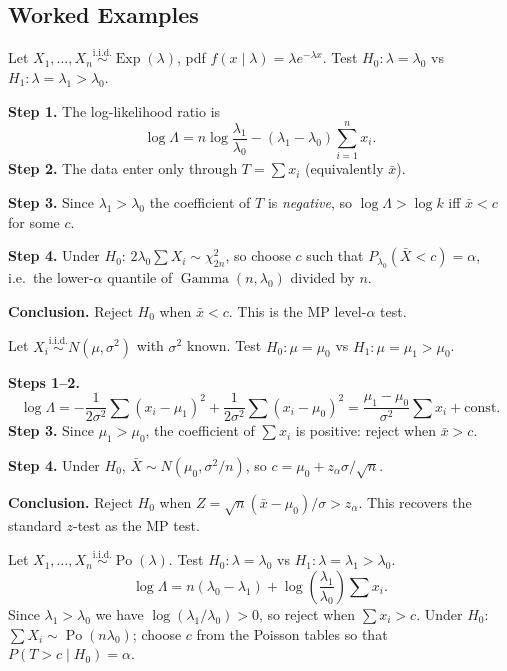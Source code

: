\documentclass[11pt, a4paper]{article}
\newcommand{\iid}{\overset{\text{i.i.d.}}{\sim}}
\begin{document}
\subsection*{Worked Examples}

\begin{exbox}
Let $X_1,\ldots,X_n \iid \operatorname{Exp}(\lambda)$, pdf $f(x \mid \lambda) = \lambda e^{-\lambda x}$. Test $H_0\colon \lambda = \lambda_0$ vs $H_1\colon \lambda = \lambda_1 > \lambda_0$.

\textbf{Step 1.} The log-likelihood ratio is
\[
  \log \Lambda = n\log\frac{\lambda_1}{\lambda_0} - (\lambda_1 - \lambda_0)\sum_{i=1}^n x_i.
\]
\textbf{Step 2.} The data enter only through $T = \sum x_i$ (equivalently $\bar{x}$).

\textbf{Step 3.} Since $\lambda_1 > \lambda_0$ the coefficient of $T$ is \emph{negative}, so $\log \Lambda > \log k$ iff $\bar{x} < c$ for some $c$.

\textbf{Step 4.} Under $H_0$: $2\lambda_0 \sum X_i \sim \chi^2_{2n}$, so choose $c$ such that $P_{\lambda_0}(\bar{X} < c) = \alpha$, i.e.\ the lower-$\alpha$ quantile of $\operatorname{Gamma}(n, \lambda_0)$ divided by $n$.

\textbf{Conclusion.} Reject $H_0$ when $\bar{x} < c$. This is the MP level-$\alpha$ test.
\end{exbox}

\begin{exbox}
Let $X_i \iid N(\mu, \sigma^2)$ with $\sigma^2$ known. Test $H_0\colon \mu = \mu_0$ vs $H_1\colon \mu = \mu_1 > \mu_0$.

\textbf{Steps 1--2.}
\[
  \log \Lambda = -\frac{1}{2\sigma^2}\sum(x_i - \mu_1)^2 + \frac{1}{2\sigma^2}\sum(x_i - \mu_0)^2 = \frac{\mu_1 - \mu_0}{\sigma^2}\sum x_i + \text{const}.
\]
\textbf{Step 3.} Since $\mu_1 > \mu_0$, the coefficient of $\sum x_i$ is positive: reject when $\bar{x} > c$.

\textbf{Step 4.} Under $H_0$, $\bar{X} \sim N(\mu_0, \sigma^2/n)$, so $c = \mu_0 + z_\alpha \sigma/\sqrt{n}$.

\textbf{Conclusion.} Reject $H_0$ when $Z = \sqrt{n}(\bar{x} - \mu_0)/\sigma > z_\alpha$. This recovers the standard $z$-test as the MP test.
\end{exbox}

\begin{exbox}
Let $X_1,\ldots,X_n \iid \operatorname{Po}(\lambda)$. Test $H_0\colon \lambda = \lambda_0$ vs $H_1\colon \lambda = \lambda_1 > \lambda_0$.
\[
  \log \Lambda = n(\lambda_0 - \lambda_1) + \log\!\left(\frac{\lambda_1}{\lambda_0}\right)\sum x_i.
\]
Since $\lambda_1 > \lambda_0$ we have $\log(\lambda_1/\lambda_0) > 0$, so reject when $\sum x_i > c$. Under $H_0$: $\sum X_i \sim \operatorname{Po}(n\lambda_0)$; choose $c$ from the Poisson tables so that $P(T > c \mid H_0) = \alpha$.
\end{exbox}
\end{document}
